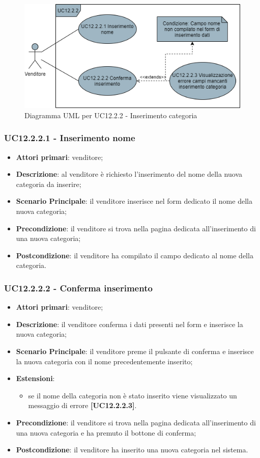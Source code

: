 \begin{figure}[H]
\centering
\includegraphics[scale=0.6]{res/UseCase/Immagini/InserimentoCategoria}
\caption{Diagramma UML per UC12.2.2 - Inserimento categoria}
\end{figure}

\subsubsection{UC12.2.2.1 - Inserimento nome}
\begin{itemize}
\item \textbf{Attori primari}: venditore;
\item \textbf{Descrizione}: al venditore è richiesto l'inserimento del nome della nuova categoria da inserire;
\item \textbf{Scenario Principale}: il venditore inserisce nel form dedicato il nome della nuova categoria;
\item \textbf{Precondizione}: il venditore si trova nella pagina dedicata all'inserimento di una nuova categoria;
\item \textbf{Postcondizione}: il venditore ha compilato il campo dedicato al nome della categoria.
\end{itemize}

\subsubsection{UC12.2.2.2 - Conferma inserimento}
\begin{itemize}
\item \textbf{Attori primari}: venditore;
\item \textbf{Descrizione}: il venditore conferma i dati presenti nel form e inserisce la nuova categoria;
\item \textbf{Scenario Principale}: il venditore preme il pulsante di conferma e inserisce la nuova categoria con il nome precedentemente inserito;
\item \textbf{Estensioni}: 
\begin{itemize}
	\item se il nome della categoria non è stato inserito viene visualizzato un messaggio di errore \textbf{[UC12.2.2.3]}.
\end{itemize} 
\item \textbf{Precondizione}: il venditore si trova nella pagina dedicata all'inserimento di una nuova categoria e ha premuto il bottone di conferma;
\item \textbf{Postcondizione}: il venditore ha inserito una nuova categoria nel sistema.
\end{itemize}


